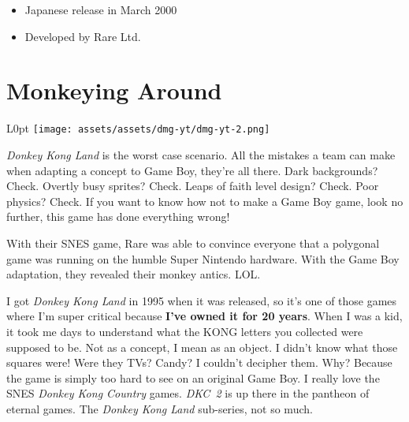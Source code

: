\documentclass{book}
\begin{document}
\begin{itemize} [nosep]
\item Japanese release in March 2000
































\item Developed by Rare Ltd.

\end{itemize}\noindent

\newpage\FloatBarrier\needspace{10mm}\section*{Monkeying Around}\nopagebreak[4]
\begin{wrapfigure}{L}{0pt} \texttt{[image: assets/assets/dmg-yt/dmg-yt-2.png]}\end{wrapfigure}
\emph{Donkey Kong Land} is the worst case scenario. All the mistakes a team can make when adapting a concept to Game Boy, they’re all there. Dark backgrounds? Check. Overtly busy sprites? Check. Leaps of faith level design? Check. Poor physics? Check. If you want to know how not to make a Game Boy game, look no further, this game has done everything wrong!

With their SNES game, Rare was able to convince everyone that a polygonal game was running on the humble Super Nintendo hardware. With the Game Boy adaptation, they revealed their monkey antics. LOL.

I got \emph{Donkey Kong Land} in 1995 when it was released, so it’s one of those games where I’m super critical because \textbf{I’ve owned it for 20 years}. When I was a kid, it took me days to understand what the KONG letters you collected were supposed to be. Not as a concept, I mean as an object. I didn’t know what those squares were! Were they TVs? Candy? I couldn’t decipher them. Why? Because the game is simply too hard to see on an original Game Boy. I really love the SNES \emph{Donkey Kong Country} games. \emph{DKC~2} is up there in the pantheon of eternal games. The \emph{Donkey Kong Land} sub-series, not so much.
\end{document}
